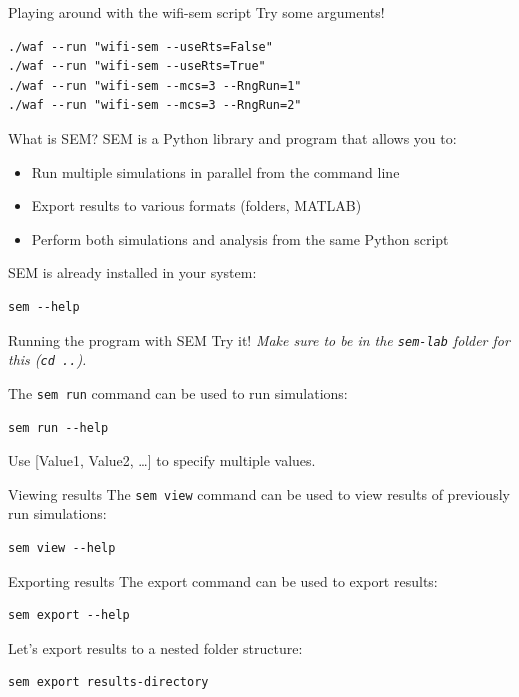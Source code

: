\documentclass[presentation]{beamer}
\begin{document}
\begin{frame}[label={sec:org2a38775},fragile]{Playing around with the wifi-sem script}
 Try some arguments!

\begin{verbatim}
./waf --run "wifi-sem --useRts=False"
./waf --run "wifi-sem --useRts=True"
./waf --run "wifi-sem --mcs=3 --RngRun=1"
./waf --run "wifi-sem --mcs=3 --RngRun=2"
\end{verbatim}
\end{frame}

\begin{frame}[label={sec:orga53e0e1},fragile]{What is SEM?}
 SEM is a Python library and program that allows you to:
\begin{itemize}
\item Run multiple simulations in parallel from the command line
\item Export results to various formats (folders, MATLAB)
\item Perform both simulations and analysis from the same Python script
\end{itemize}

SEM is already installed in your system:
\begin{verbatim}
sem --help
\end{verbatim}
\end{frame}

\begin{frame}[label={sec:org64b9214},fragile]{Running the program with SEM}
 Try it! \emph{Make sure to be in the \texttt{sem-lab} folder for this (\texttt{cd ..}).}

The \texttt{sem run} command can be used to run simulations:

\begin{verbatim}
sem run --help
\end{verbatim}

Use [Value1, Value2, \ldots{}] to specify multiple values.
\end{frame}

\begin{frame}[label={sec:org9e35f3a},fragile]{Viewing results}
 The \texttt{sem view} command can be used to view results of previously run
simulations:

\begin{verbatim}
sem view --help
\end{verbatim}
\end{frame}

\begin{frame}[label={sec:org0477560},fragile]{Exporting results}
 The export command can be used to export results:
\begin{verbatim}
sem export --help
\end{verbatim}

Let's export results to a nested folder structure:
\begin{verbatim}
sem export results-directory
\end{verbatim}
\end{frame}
\end{document}
